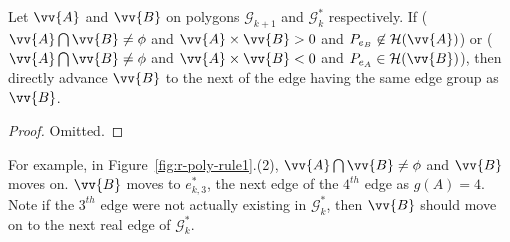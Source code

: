 \begin{theorem}
\label{prop-rule2}
Let $\vv{A}$ and $\vv{B}$ on polygons $\mathcal{G}_{k+1}$ and $\mathcal{G}^*_k$ respectively.
If ($\vv{A} \bigcap \vv{B} \ne \phi$ and $\vv{A} \times \vv{B} > 0$ and $P_{e_B} \not \in \mathcal{H}(\vv{A})$) or ($\vv{A} \bigcap \vv{B} \ne \phi$ and $\vv{A} \times \vv{B} < 0$ and $P_{e_A} \in \mathcal{H}(\vv{B})$), then directly advance $\vv{B}$ to the next of the edge having the same edge group as $\vv{B}$.
\end{theorem}

\begin{proof}
Omitted.
\end{proof}

For example, in Figure~\ref{fig:r-poly-rule1}.(2), $\vv{A} \bigcap \vv{B} \ne \phi$ and $\vv{B}$ moves on. $\vv{B}$ moves to $e^*_{k, 3}$, \ie the next edge of the $4^{th}$ edge as $g(A) = 4$.
Note if the $3^{th}$ edge were not actually existing in $\mathcal{G}^*_k$, then $\vv{B}$ should move on to the next real edge of $\mathcal{G}^*_k$.




